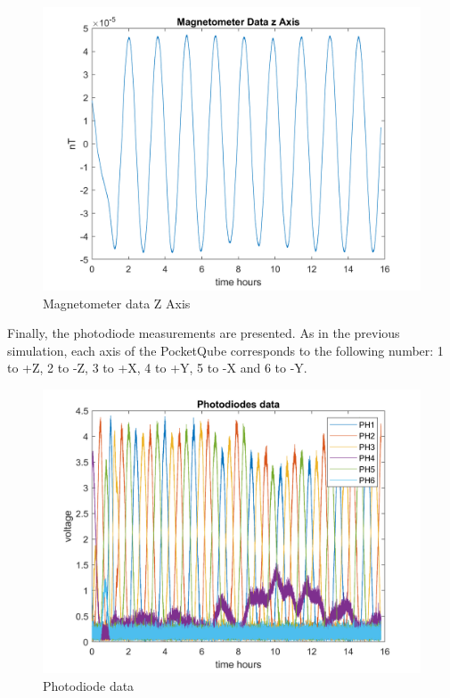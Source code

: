 \begin{itemize}
\begin{figure}[H]
        \begin{minipage}{0.32\linewidth}
            \centering
            \includegraphics[width=0.95\linewidth]{res/img/Nadir_EKF/Simulations/Magnetometer data Z Axis.png}
            \caption{Magnetometer data Z Axis}
            \label{fig:MagnetometerDataZ}
        \end{minipage}
    \end{figure}

    Finally, the photodiode measurements are presented. As in the previous simulation, each axis of the PocketQube corresponds to the following number: 1 to +Z, 2 to -Z, 3 to +X, 4 to +Y,
    5 to -X and 6 to -Y.
    \begin{figure}[H]
        \centering
        \includegraphics[width=0.7\linewidth]{res/img/Nadir_EKF/Simulations/Photodiode data.png}
        \caption{Photodiode data}
        \label{fig:PhotodiodeData}
    \end{figure}


\end{itemize}
